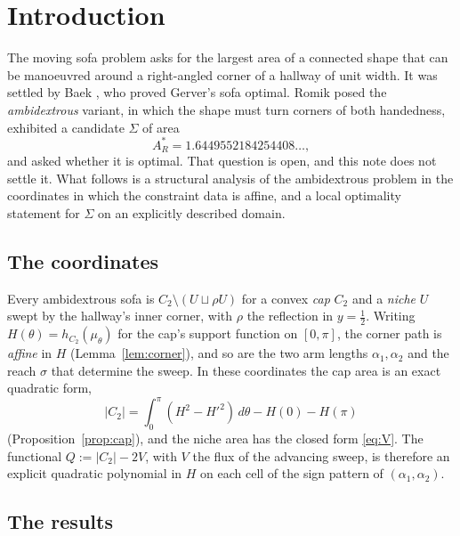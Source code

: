 \documentclass[11pt]{article}
\theoremstyle{definition}
\newcommand{\Sig}{\Sigma}
\begin{document}
\section{Introduction}\label{sec:intro}

The moving sofa problem asks for the largest area of a connected shape that can be
manoeuvred around a right-angled corner of a hallway of unit width. It was settled by
Baek \cite{Bae24}, who proved Gerver's sofa \cite{Ger92} optimal. Romik \cite{Rom18}
posed the \emph{ambidextrous} variant, in which the shape must turn corners of both
handedness, exhibited a candidate $\Sig$ of area
\[
  A_R^\ast=1.6449552184254408\ldots,
\]
and asked whether it is optimal. That question is open, and this note does not settle it.
What follows is a structural analysis of the ambidextrous problem in the coordinates in
which the constraint data is affine, and a local optimality statement for $\Sig$ on an
explicitly described domain.

\subsection*{The coordinates}

Every ambidextrous sofa is $C_2\setminus(U\sqcup\rho U)$ for a convex \emph{cap} $C_2$ and
a \emph{niche} $U$ swept by the hallway's inner corner, with $\rho$ the reflection in
$y=\tfrac12$. Writing $H(\theta)=h_{C_2}(\mu_\theta)$ for the cap's support function on
$[0,\pi]$, the corner path is \emph{affine} in $H$ (Lemma~\ref{lem:corner}), and so are the
two arm lengths $\alpha_1,\alpha_2$ and the reach $\sigma$ that determine the sweep. In
these coordinates the cap area is an exact quadratic form,
\[
  |C_2|=\int_0^\pi(H^2-H'^2)\,d\theta-H(0)-H(\pi)
\]
(Proposition~\ref{prop:cap}), and the niche area has the closed form \eqref{eq:V}. The
functional $Q:=|C_2|-2V$, with $V$ the flux of the advancing sweep, is therefore an
explicit quadratic polynomial in $H$ on each cell of the sign pattern of
$(\alpha_1,\alpha_2)$.

\subsection*{The results}
\end{document}
